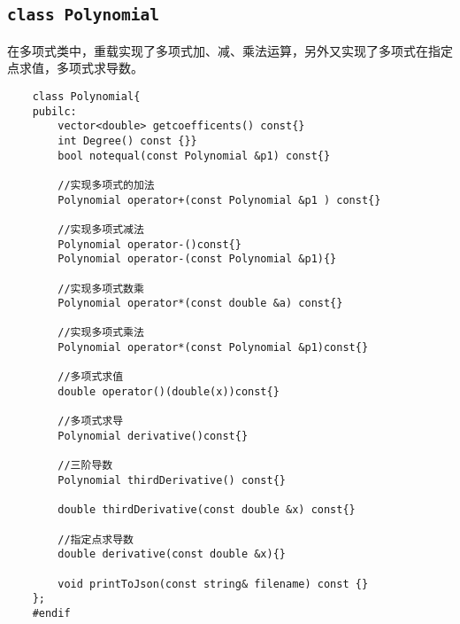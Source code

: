 \documentclass[UTF8]{ctexart}
\begin{document}
	\subsection{\texttt{class Polynomial}}
	在多项式类中，重载实现了多项式加、减、乘法运算，另外又实现了多项式在指定点求值，多项式求导数。
	\begin{lstlisting}		
	class Polynomial{
	pubilc:
		vector<double> getcoefficents() const{}
		int Degree() const {}}
		bool notequal(const Polynomial &p1) const{}
			
		//实现多项式的加法
		Polynomial operator+(const Polynomial &p1 ) const{}

		//实现多项式减法
		Polynomial operator-()const{}
		Polynomial operator-(const Polynomial &p1){}
			
		//实现多项式数乘
		Polynomial operator*(const double &a) const{}
			
		//实现多项式乘法
		Polynomial operator*(const Polynomial &p1)const{}
			
		//多项式求值
		double operator()(double(x))const{}
			
		//多项式求导
		Polynomial derivative()const{}
			
		//三阶导数
		Polynomial thirdDerivative() const{}
			
		double thirdDerivative(const double &x) const{}
			
		//指定点求导数
		double derivative(const double &x){}
			
		void printToJson(const string& filename) const {}
	};
	#endif
	\end{lstlisting}
\end{document}
